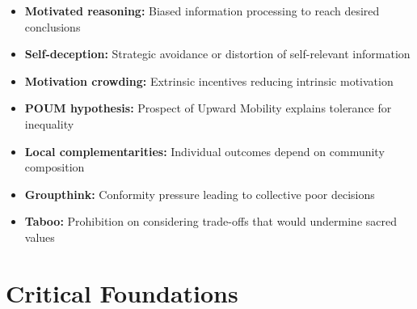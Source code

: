 \begin{itemize}
    \item \textbf{Motivated reasoning:} Biased information processing to reach desired conclusions
    \item \textbf{Self-deception:} Strategic avoidance or distortion of self-relevant information
    \item \textbf{Motivation crowding:} Extrinsic incentives reducing intrinsic motivation
    \item \textbf{POUM hypothesis:} Prospect of Upward Mobility explains tolerance for inequality
    \item \textbf{Local complementarities:} Individual outcomes depend on community composition
    \item \textbf{Groupthink:} Conformity pressure leading to collective poor decisions
    \item \textbf{Taboo:} Prohibition on considering trade-offs that would undermine sacred values
\end{itemize}

\section{Critical Foundations}
\label{sec:rb-foundations}

